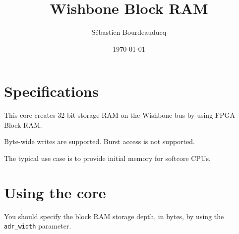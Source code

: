 \documentclass[a4paper,11pt]{article}
\title{Wishbone Block RAM}
\author{S\'ebastien Bourdeauducq}
\date{\today}
\begin{document}
\setlength{\parindent}{0pt}
\setlength{\parskip}{5pt}
\maketitle{}
\section{Specifications}
This core creates 32-bit storage RAM on the Wishbone bus by using FPGA Block RAM.

Byte-wide writes are supported. Burst access is not supported.

The typical use case is to provide initial memory for softcore CPUs.

\section{Using the core}
You should specify the block RAM storage depth, in bytes, by using the \verb!adr_width! parameter.
\end{document}
